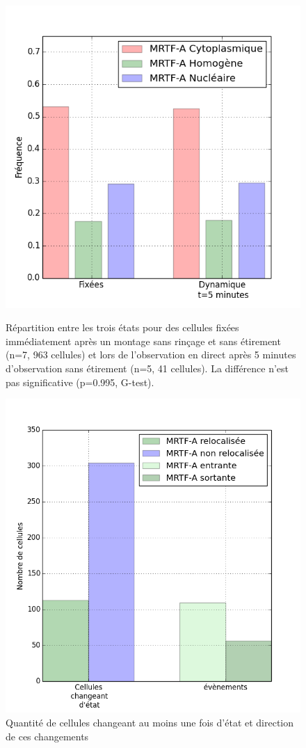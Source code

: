\documentclass{report}
\begin{document}
\begin{figure}
\includegraphics[scale=0.5]{Figures/Reference.png} 
\caption{Répartition entre les trois états pour des cellules fixées immédiatement après un montage sans rinçage et sans étirement (n=7, 963 cellules) et lors de l'observation en direct après 5 minutes d'observation sans étirement (n=5, 41 cellules). La différence n'est pas significative (p=0.995, G-test).
\label{Référence}}
\includegraphics[scale=0.4]{Figures/Reference_transloc.png} 
\caption{Quantité de cellules changeant au moins une fois d'état et direction de ces changements \label{Ref_transloc}}
\end{figure}
\end{document}
